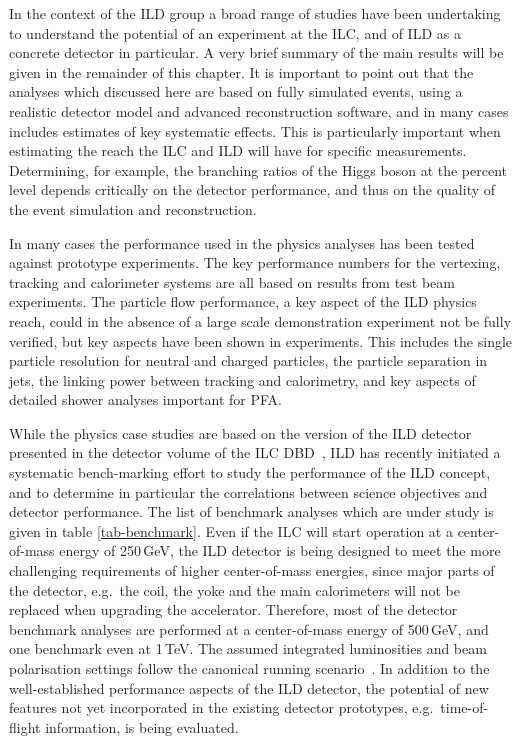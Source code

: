 In the context of the ILD group a broad range of studies have been undertaking to understand the potential of an experiment at the ILC, and of ILD as a concrete detector in particular. A very brief summary of the main results will be given in the remainder of this chapter. It is important to point out that 
 the analyses which discussed here are based on fully simulated events, using a realistic detector model and advanced reconstruction software, and in many cases includes estimates of key systematic effects. This is particularly important when estimating the reach the ILC and ILD will have for specific measurements. Determining, for example, the branching ratios of the Higgs boson at the percent level depends critically on the detector performance, and thus on the quality of the event simulation and reconstruction. 

In many cases the performance used in the physics analyses has been tested against prototype experiments. The key performance numbers for the vertexing, tracking and calorimeter systems are all based on results from test beam experiments. The particle flow performance, a key aspect of the ILD physics reach, could in the absence of a large scale demonstration experiment not be fully verified, but key aspects have been shown in experiments. This includes the single particle resolution for neutral and charged particles, the particle separation in jets, the linking power between tracking and calorimetry, and key aspects of detailed shower analyses important for PFA. 

While the physics case studies are based on the version of the ILD detector presented in the detector volume of the ILC DBD~\cite{Behnke:2013lya}, ILD has recently initiated a systematic bench-marking effort to study the performance of the ILD concept, and to determine in particular the correlations between science objectives and detector performance. The list of benchmark analyses which are under study is given in table \ref{tab-benchmark}. Even if the ILC will start operation at a center-of-mass energy of 250\,GeV, the ILD detector is being designed to meet the more challenging requirements of higher center-of-mass energies, since major parts of the detector, e.g.\ the coil, the yoke and the main calorimeters will not be replaced when upgrading the accelerator. Therefore, most of the detector benchmark analyses are performed at a center-of-mass energy of 500\,GeV, and one benchmark even at 1\,TeV. The assumed integrated luminosities and beam polarisation settings follow the canonical running scenario~\cite{Barklow:2015tja}. 
In addition to the well-established performance aspects of the ILD detector, the potential of new features not yet incorporated in the existing detector prototypes, e.g.\ time-of-flight information, is being evaluated. 
